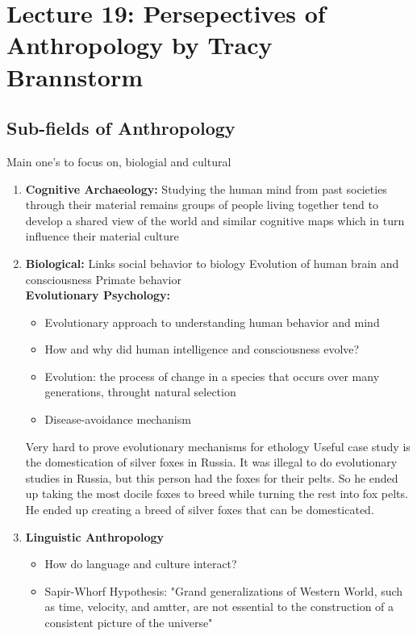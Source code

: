 \documentclass{article}
\begin{document}
\section{Lecture 19: Persepectives of Anthropology by Tracy Brannstorm}

\subsection{Sub-fields of Anthropology}
Main one's to focus on, biologial and cultural 
\begin{enumerate}
    \item \textbf{Cognitive Archaeology:} Studying the human mind from past societies through their material remains
        \subitem groups of people living together tend to develop a shared view of the world and similar cognitive maps which in turn influence their material culture
    \item \textbf{Biological:} Links social behavior to biology
        \subitem Evolution of human brain and consciousness
        \subitem Primate behavior \\
        \textbf{Evolutionary Psychology:}
            \begin{itemize}
                \item Evolutionary approach to understanding human behavior and mind 
                \item How and why did human intelligence and consciousness evolve? 
                \item Evolution: the process of change in a species that occurs over many generations, throught natural selection
                \item Disease-avoidance mechanism
            \end{itemize}
        \subitem Very hard to prove evolutionary mechanisms for ethology
        \subitem Useful case study is the domestication of silver foxes in Russia. It was illegal to do evolutionary studies in Russia, but this person had the foxes for their pelts. So he ended up taking the most docile foxes to breed while turning the rest into fox pelts. He ended up creating a breed of silver foxes that can be domesticated. 
    \item \textbf{Linguistic Anthropology}
        \begin{itemize}
            \item How do language and culture interact? 
            \item Sapir-Whorf Hypothesis: "Grand generalizations of Western World, such as time, velocity, and amtter, are not essential to the construction of a consistent picture of the universe" 

\end{itemize}
\end{enumerate}
\end{document}
